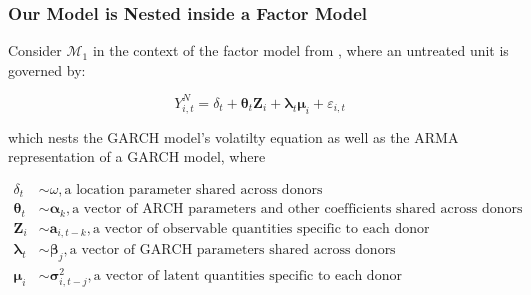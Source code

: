 \documentclass[9pt]{beamer}
\def\mc#1{\mathcal{#1}} %
\def\mc#1{\mathcal{#1}}
\theoremstyle{definition}
\begin{document}
\begin{frame}
\frametitle{Our Model is Nested inside a Factor Model}

\fontsize{6}{7.2}

Consider $\mc{M}_{1}$ in the context of the factor model from \cite[][]{abadie2010synthetic}, where an untreated unit is governed by:

$$Y^{N}_{i,t} = \delta_{t} + \boldsymbol\theta_{t}\textbf{Z}_{i}+\boldsymbol\lambda_{t}\boldsymbol\mu_{i}+\varepsilon_{i,t}$$

which nests the GARCH model's volatilty equation as well as the ARMA representation of a GARCH model, where

\begin{align*}
\delta_{t} & \sim \omega, \text{a location parameter shared across donors}\\
\boldsymbol\theta_{t} & \sim \boldsymbol\alpha_{k}, \text{a vector of ARCH parameters and other coefficients shared across donors} \\
\textbf{Z}_{i} & \sim \boldsymbol a_{i,t-k}, \text{a vector of observable quantities specific to each donor} \\
\boldsymbol \lambda_{t} & \sim \boldsymbol\beta_{j}, \text{a vector of GARCH parameters shared across donors} \\
\boldsymbol \mu_{i} & \sim \boldsymbol \sigma_{i,t-j}^{2}, \text{a vector of latent quantities specific to each donor}   \\
\end{align*}

\end{frame}
\end{document}
